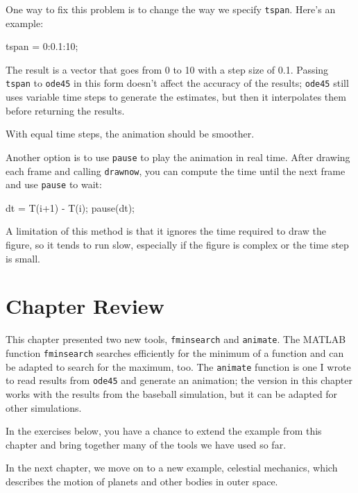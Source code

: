 
One way to fix this problem is to change the way we specify \lstinline{tspan}.
Here's an example:

\begin{code}
    tspan = 0:0.1:10;
\end{code}

The result is a vector that goes from 0 to 10 with a step size of 0.1.  
Passing \lstinline{tspan} to \lstinline{ode45} in this form doesn't affect the accuracy of the results; 
\lstinline{ode45} still uses variable time steps to generate the estimates, but then it interpolates them before returning the results.


With equal time steps, the animation should be smoother.

Another option is to use \lstinline{pause} to play the animation in
real time.  After drawing each frame and calling
\lstinline{drawnow}, you can compute the time
until the next frame and use \lstinline{pause} to wait:

\begin{code}
    dt = T(i+1) - T(i);
    pause(dt);
\end{code}

A limitation of this method is that it ignores the time required to
draw the figure, so it tends to run slow, especially if the figure is
complex or the time step is small.

\section{Chapter Review}

This chapter presented two new tools, \lstinline{fminsearch} and \lstinline{animate}.  
The MATLAB function \lstinline{fminsearch} searches efficiently for the minimum of a function and can be adapted to search for the maximum, too.
The \lstinline{animate} function is one I wrote to read results from \lstinline{ode45} and generate an animation; the version in this chapter works with the results from the baseball simulation, but it can be adapted for other simulations.

In the exercises below, you have a chance to extend the example from this chapter and bring together many of the tools we have used so far.

In the next chapter, we move on to a new example, celestial mechanics, which describes the motion of planets and other bodies in outer space.



